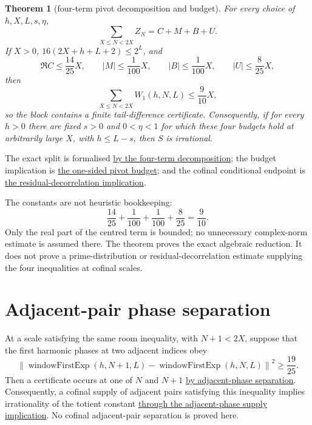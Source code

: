 \documentclass[11pt]{article}
\newcommand{\commit}{c24e2c2a781aa4a104d10884bacae52ef35cff30}
\newcommand{\repobase}{https://github.com/wcook04/plectis-lean-erdos249-257/blob/\commit}
\newcommand{\PK}{Erdos249257}
\newcommand{\lword}[4]{\href{\repobase/\PK/#1\#L#2}{#4}}
\newtheorem{theorem}{Theorem}[section]
\theoremstyle{remark}\newtheorem*{remark}{Remark}
\begin{document}
\begin{theorem}[four-term pivot decomposition and budget]
\label{thm:first-pivot}
For every choice of \(h,X,L,s,\eta\),
\[
  \sum_{X\le N<2X}Z_N=C+M+B+U.
\]
If \(X>0\), \(16(2X+h+L+2)\le2^L\), and
\[
 \Re C\le\frac{14}{25}X,\qquad
 |M|\le\frac1{100}X,\qquad
 |B|\le\frac1{100}X,\qquad
 |U|\le\frac8{25}X,
\]
then
\[
 \sum_{X\le N<2X}W_1(h,N,L)\le\frac9{10}X,
\]
so the block contains a finite tail-difference certificate.  Consequently,
if for every \(h>0\) there are fixed \(s>0\) and \(0<\eta<1\) for which these
four budgets hold at arbitrarily large \(X\), with \(h\le L-s\), then \(S\)
is irrational.
\end{theorem}
\noindent The exact split is formalised
\lword{FirstHarmonicPivot.lean}{342}{windowFirstExp_sum_eq_pivot_decomposition}{by the four-term decomposition};
the budget implication is
\lword{FirstHarmonicPivot.lean}{377}{first_harmonic_gap_of_pivotBudgetAt}{the one-sided pivot budget};
and the cofinal conditional endpoint is
\lword{FirstHarmonicPivot.lean}{405}{irrational_totient_series_of_pivotResidualDecorrelation}{the residual-decorrelation implication}.

The constants are not heuristic bookkeeping:
\[
 \frac{14}{25}+\frac1{100}+\frac1{100}+\frac8{25}
 =\frac9{10}.
\]
Only the real part of the centred term is bounded; no unnecessary complex-norm
estimate is assumed there.  The theorem proves the exact algebraic reduction.
It does not prove a prime-distribution or residual-decorrelation estimate
supplying the four inequalities at cofinal scales.

\section{Adjacent-pair phase separation}\label{sec:adjacentphase}
At a scale satisfying the same room inequality, with $N+1<2X$, suppose that
the first harmonic phases at two adjacent indices obey
\[
 \left\lVert
 \operatorname{windowFirstExp}(h,N+1,L)-\operatorname{windowFirstExp}(h,N,L)
 \right\rVert^2\ge\frac{19}{25}.
\]
Then a certificate occurs at one of $N$ and $N+1$
\lword{AdjacentPhaseSeparation.lean}{258}{exists_certifiedKill_of_phasePairSeparation}{by adjacent-phase separation}.
Consequently, a cofinal supply of adjacent pairs satisfying this inequality
implies irrationality of the totient constant
\lword{AdjacentPhaseSeparation.lean}{295}{irrational_totient_series_of_adjacentPhaseSeparation}{through the adjacent-phase supply implication}.
No cofinal adjacent-pair separation is proved here.
\end{document}
